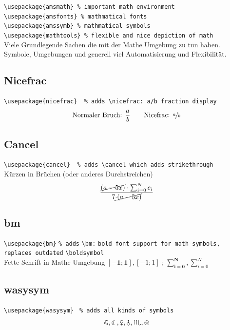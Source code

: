 \documentclass[titlepage, 11pt, a4paper,ngerman]{article}
\begin{document}
\verb|\usepackage{amsmath} % important math environment|\\
\verb|\usepackage{amsfonts} % mathmatical fonts|\\
\verb|\usepackage{amssymb} % mathmatical symbols|\\
\verb|\usepackage{mathtools} % flexible and nice depiction of math|\\[10pt]
Viele Grundlegende Sachen die mit der Mathe Umgebung zu tun haben. Symbole, Umgebungen und generell viel Automatisierung und Flexibilität.

\subsection{Nicefrac}

\verb|\usepackage{nicefrac}  % adds \nicefrac: a/b fraction display|\\[10pt]
\begin{equation}
\textrm{Normaler Bruch: } \frac{a}{b} \qquad \textrm{Nicefrac: } \nicefrac{a}{b}
\end{equation}

\subsection{Cancel}

\verb|\usepackage{cancel}  % adds \cancel which adds strikethrough|\\[10pt]
Kürzen in Brüchen (oder anderes Durchstreichen)
\begin{equation}
\frac{\cancel{(a - 5x)} \cdot \sum_{i=0}^{N} c_i}{7 \cancel{\cdot (a - 5x)}}
\end{equation}

\subsection{bm}

\verb|\usepackage{bm}| \texttt{\% adds} \verb|\bm:| \texttt{bold font support for math-symbols, replaces outdated} \verb|\boldsymbol|\\[10pt]
Fette Schrift in Mathe Umgebung $ \bm{[-1;1]} , [-1;1] \ ; \ \bm{\sum}_{\bm{i=0}}^{\bm{N}}, \sum_{i=0}^{N}$

\subsection{wasysym}

\verb|\usepackage{wasysym}| \texttt{ \% adds all kinds of symbols}\\[10pt]
\begin{equation}
\twonotes, \leftmoon, \venus, \uranus, \scorpio, \APLlog
\end{equation}
\end{document}
